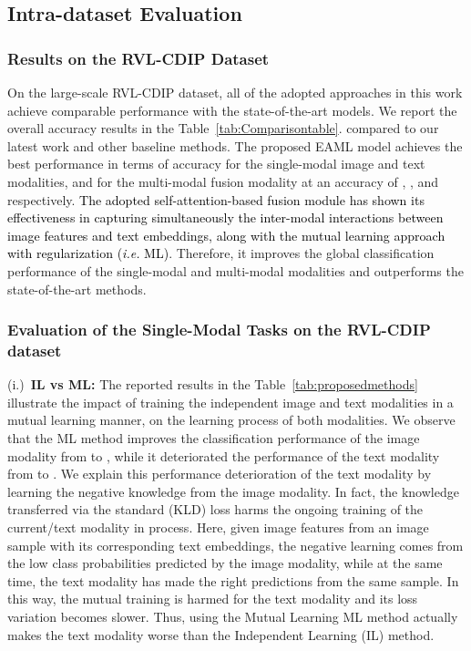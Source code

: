 \documentclass[twocolumn]{svjour3}
\newcommand{\ie}{\textit{i.e. }}
\begin{document}
\subsection{Intra-dataset Evaluation}

\subsubsection{Results on the RVL-CDIP Dataset}

On the large-scale RVL-CDIP dataset, all of the adopted approaches in this work achieve comparable performance with the state-of-the-art models. We report the overall accuracy results in the Table~\ref{tab:Comparisontable}. compared to our latest work\cite{souhailbakkali} and other baseline methods. The proposed EAML model achieves the best performance in terms of accuracy for the single-modal image and text modalities, and for the multi-modal fusion modality at an accuracy of , , and  respectively. \textcolor{black}{The adopted self-attention-based fusion module has shown its effectiveness in capturing simultaneously the inter-modal interactions between image features and text embeddings, along with the mutual learning approach with regularization (\ie ML)}.
Therefore, it improves the global classification performance of the single-modal and multi-modal modalities and outperforms the state-of-the-art methods.



\subsubsection{Evaluation of the Single-Modal Tasks on the RVL-CDIP dataset}

(i.)\noindent~\textbf{IL vs ML:}
The reported results in the Table~\ref{tab:proposedmethods} illustrate the impact of training the independent image and text modalities in a mutual learning manner, on the learning process of both modalities. We observe that the ML method improves the classification performance of the image modality from  to , while it deteriorated the performance of the text modality from  to . We explain this performance deterioration of the text modality by learning the negative knowledge from the image modality. In fact, the knowledge transferred via the standard (KLD) loss harms the ongoing training of the current/text modality in process. Here, given image features from an image sample with its corresponding text embeddings, the negative learning comes from the low class probabilities predicted by the image modality, while at the same time, the text modality has made the right predictions from the same sample.
In this way, the mutual training is harmed for the text modality and its loss variation  becomes slower. Thus, using the Mutual Learning ML method actually makes the text modality worse than the Independent Learning (IL) method. 
\end{document}
